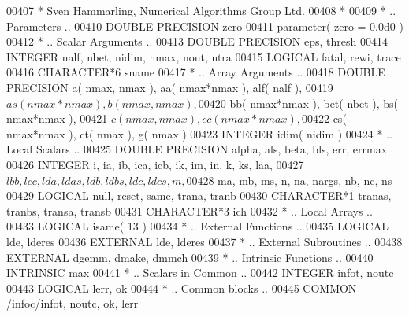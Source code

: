\begin{DoxyCode}
00407 \textcolor{comment}{*     Sven Hammarling, Numerical Algorithms Group Ltd.}
00408 \textcolor{comment}{*}
00409 \textcolor{comment}{*     .. Parameters ..}
00410       \textcolor{keywordtype}{DOUBLE PRECISION}   zero
00411       parameter( zero = 0.0d0 )
00412 \textcolor{comment}{*     .. Scalar Arguments ..}
00413       \textcolor{keywordtype}{DOUBLE PRECISION}   eps, thresh
00414       \textcolor{keywordtype}{INTEGER}            nalf, nbet, nidim, nmax, nout, ntra
00415       \textcolor{keywordtype}{LOGICAL}            fatal, rewi, trace
00416       \textcolor{keywordtype}{CHARACTER*6}        sname
00417 \textcolor{comment}{*     .. Array Arguments ..}
00418       \textcolor{keywordtype}{DOUBLE PRECISION}   a( nmax, nmax ), aa( nmax*nmax ), alf( nalf ),
00419      $                   as( nmax*nmax ), b( nmax, nmax ),
00420      $                   bb( nmax*nmax ), bet( nbet ), bs( nmax*nmax ),
00421      $                   c( nmax, nmax ), cc( nmax*nmax ),
00422      $                   cs( nmax*nmax ), ct( nmax ), g( nmax )
00423       \textcolor{keywordtype}{INTEGER}            idim( nidim )
00424 \textcolor{comment}{*     .. Local Scalars ..}
00425       \textcolor{keywordtype}{DOUBLE PRECISION}   alpha, als, beta, bls, err, errmax
00426       \textcolor{keywordtype}{INTEGER}            i, ia, ib, ica, icb, ik, im, in, k, ks, laa,
00427      $                   lbb, lcc, lda, ldas, ldb, ldbs, ldc, ldcs, m,
00428      $                   ma, mb, ms, n, na, nargs, nb, nc, ns
00429       \textcolor{keywordtype}{LOGICAL}            null, reset, same, trana, tranb
00430       \textcolor{keywordtype}{CHARACTER*1}        tranas, tranbs, transa, transb
00431       \textcolor{keywordtype}{CHARACTER*3}        ich
00432 \textcolor{comment}{*     .. Local Arrays ..}
00433       \textcolor{keywordtype}{LOGICAL}            isame( 13 )
00434 \textcolor{comment}{*     .. External Functions ..}
00435       \textcolor{keywordtype}{LOGICAL}            lde, lderes
00436       \textcolor{keywordtype}{EXTERNAL}           lde, lderes
00437 \textcolor{comment}{*     .. External Subroutines ..}
00438       \textcolor{keywordtype}{EXTERNAL}           dgemm, dmake, dmmch
00439 \textcolor{comment}{*     .. Intrinsic Functions ..}
00440       \textcolor{keywordtype}{INTRINSIC}          max
00441 \textcolor{comment}{*     .. Scalars in Common ..}
00442       \textcolor{keywordtype}{INTEGER}            infot, noutc
00443       \textcolor{keywordtype}{LOGICAL}            lerr, ok
00444 \textcolor{comment}{*     .. Common blocks ..}
00445       \textcolor{keyword}{COMMON}             /infoc/infot, noutc, ok, lerr

\end{DoxyCode}
